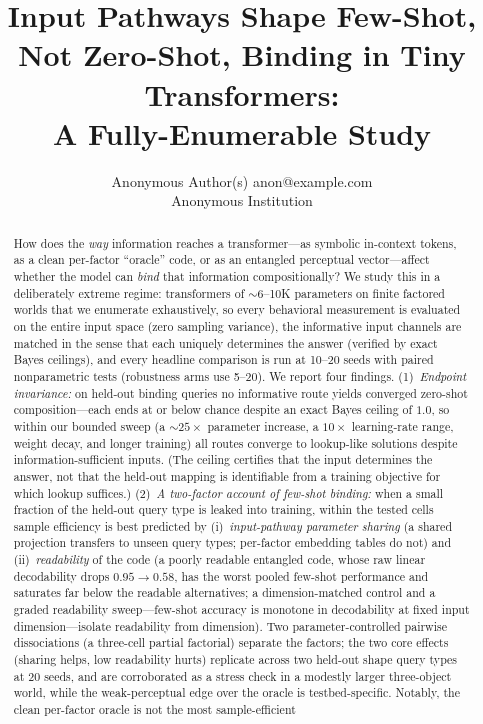 \documentclass[10pt]{article} %
\title{Input Pathways Shape Few-Shot, Not Zero-Shot, Binding in Tiny Transformers:\\
A Fully-Enumerable Study}
\author{\name Anonymous Author(s) \email anon@example.com \\
      \addr Anonymous Institution}
\begin{document}
\maketitle

\begin{abstract}
How does the \emph{way} information reaches a transformer---as symbolic in-context tokens, as a
clean per-factor ``oracle'' code, or as an entangled perceptual vector---affect whether the model
can \emph{bind} that information compositionally? We study this in a deliberately extreme regime:
transformers of $\sim$6--10K parameters on finite factored worlds that we enumerate exhaustively,
so every behavioral measurement is evaluated on the entire input space (zero sampling variance),
the informative input channels are matched in the sense that each uniquely determines the answer
(verified by exact Bayes ceilings), and every headline comparison is run at 10--20 seeds with
paired nonparametric tests (robustness arms use 5--20).
We report four findings. (1)~\emph{Endpoint invariance:} on held-out binding queries no informative
route yields converged zero-shot composition---each ends at or below chance despite an exact Bayes
ceiling of $1.0$, so within our bounded sweep (a ${\sim}25\times$ parameter increase, a $10\times$
learning-rate range, weight decay, and longer training) all routes converge to lookup-like solutions
despite information-sufficient inputs. (The ceiling certifies that the input determines the answer,
not that the held-out mapping is identifiable from a training objective for which lookup suffices.)
(2)~\emph{A two-factor account of few-shot binding:} when a small fraction of the held-out query
type is leaked into training, within the tested cells sample efficiency is best predicted by
(i)~\emph{input-pathway parameter sharing} (a shared projection transfers to unseen query types;
per-factor embedding tables do not) and (ii)~\emph{readability} of the code (a poorly readable
entangled code, whose raw linear decodability drops $0.95 \to 0.58$, has the worst pooled few-shot
performance and saturates far below the readable alternatives; a dimension-matched control and a
graded readability sweep---few-shot accuracy is monotone in decodability at fixed input
dimension---isolate readability from dimension). Two parameter-controlled pairwise dissociations (a three-cell
partial factorial) separate the factors; the two core effects (sharing helps, low readability hurts)
replicate across two held-out shape query types at 20 seeds, and are corroborated as a stress check
in a modestly larger three-object world, while the weak-perceptual edge over the oracle is testbed-specific. Notably, the clean per-factor oracle is not the most sample-efficient

\end{abstract}
\end{document}
